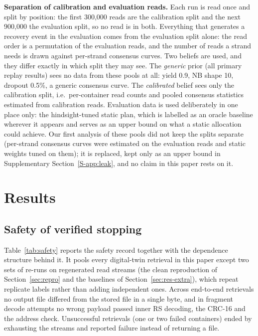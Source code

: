 \documentclass[conference,onecolumn,11pt]{IEEEtran}
\begin{document}
\textbf{Separation of calibration and evaluation reads.}  Each run is read once and split by position: the first
300{,}000 reads are the calibration split and the next 900{,}000 the evaluation split, so no read is in
both.  Everything that generates a recovery event in the evaluation comes from the evaluation split
alone: the read order is a permutation of the evaluation reads, and the number of reads a strand needs
is drawn against per-strand consensus curves.  Two beliefs are used, and they differ exactly in which
split they may see.  The \emph{generic} prior (all primary replay results) sees no data from these pools
at all: yield 0.9, NB shape 10, dropout 0.5\%, a generic consensus curve.  The \emph{calibrated}
belief sees only the calibration split, i.e.\
per-container read counts and pooled consensus statistics estimated from calibration reads.  Evaluation
data is used deliberately in one place only: the hindsight-tuned static plan, which is labelled as an
oracle baseline wherever it appears and serves as an upper bound on what a static allocation could
achieve.  Our first analysis of these pools did not keep the splits separate (per-strand consensus
curves were estimated on the evaluation reads and static weights tuned on them); it is replaced, kept
only as an upper bound in Supplementary Section~\ref{S-app:leak}, and no claim in this paper rests on it.

\section{Results}\label{sec:results}
\subsection{Safety of verified stopping}

Table~\ref{tab:safety} reports the safety record together with the dependence structure behind it.  It
pools every digital-twin retrieval in this paper except two sets of re-runs on regenerated read streams
(the clean reproduction of Section~\ref{sec:repro} and the baselines of Section~\ref{sec:res-extra}),
which repeat replicate labels rather than adding independent ones.  Across \SafeN{} end-to-end retrievals
no output file differed from the stored file in a single byte, and in \SafeAtt{} fragment decode attempts
no wrong payload passed inner RS decoding, the CRC-16 and the address check.  Unsuccessful retrievals
(one or two failed containers) ended by exhausting the streams and reported failure instead of returning
a file.
\end{document}
